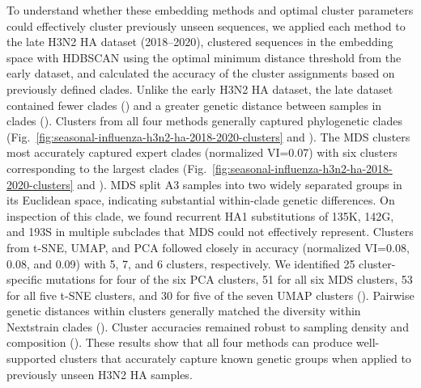 \documentclass[10pt,letterpaper]{article}
\begin{document}
To understand whether these embedding methods and optimal cluster parameters could effectively cluster previously unseen sequences, we applied each method to the late H3N2 HA dataset (2018--2020), clustered sequences in the embedding space with HDBSCAN using the optimal minimum distance threshold from the early dataset, and calculated the accuracy of the cluster assignments based on previously defined clades.
Unlike the early H3N2 HA dataset, the late dataset contained fewer clades () and a greater genetic distance between samples in clades ().
Clusters from all four methods generally captured phylogenetic clades (Fig.~\ref{fig:seasonal-influenza-h3n2-ha-2018-2020-clusters} and ).
The MDS clusters most accurately captured expert clades (normalized VI=0.07) with six clusters corresponding to the largest clades (Fig.~\ref{fig:seasonal-influenza-h3n2-ha-2018-2020-clusters} and ).
MDS split A3 samples into two widely separated groups in its Euclidean space, indicating substantial within-clade genetic differences.
On inspection of this clade, we found recurrent HA1 substitutions of 135K, 142G, and 193S in multiple subclades that MDS could not effectively represent.
Clusters from t-SNE, UMAP, and PCA followed closely in accuracy (normalized VI=0.08, 0.08, and 0.09) with 5, 7, and 6 clusters, respectively.
We identified 25 cluster-specific mutations for four of the six PCA clusters, 51 for all six MDS clusters, 53 for all five t-SNE clusters, and 30 for five of the seven UMAP clusters ().
Pairwise genetic distances within clusters generally matched the diversity within Nextstrain clades ().
Cluster accuracies remained robust to sampling density and composition ().
These results show that all four methods can produce well-supported clusters that accurately capture known genetic groups when applied to previously unseen H3N2 HA samples.
\end{document}
